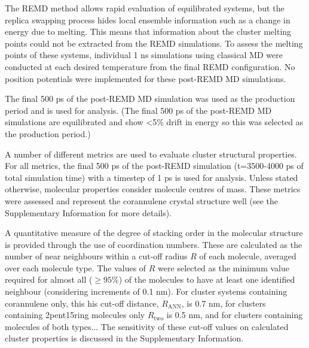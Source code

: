 The REMD method allows rapid evaluation of equilibrated systems, but the replica swapping process hides local ensemble information such as a change in energy due to melting. This means that information about the cluster melting points could not be extracted from the REMD simulations. To assess the melting points of these systems, individual 1 ns simulations using classical MD were conducted at each desired temperature from the final REMD configuration. No position potentials were implemented for these post-REMD MD simulations.

The final 500 ps of the post-REMD MD simulation was used as the production period and is used for analysis.
(The final 500 ps of the post-REMD MD simulations are equilibrated and show <5\% drift in energy so this was selected as the production period.)

A number of different metrics are used to evaluate cluster structural properties. For all metrics, the final 500 ps of the post-REMD simulation (t=3500-4000 ps of total simulation time) with a timestep of 1 ps is used for analysis. Unless stated otherwise, molecular properties consider molecule centres of mass.
These metrics were assessed and represent the corannulene crystal structure well (see the Supplementary Information for more details).


A quantitative measure of the degree of stacking order in the molecular structure is provided through the use of coordination numbers. These are calculated as the number of near neighbours within a cut-off radius $R$ of each molecule, averaged over each molecule type. 
The values of $R$ were selected as the minimum value required for almost all ($\ge 95\%$) of the molecules to have at least one identified neighbour (considering increments of 0.1 nm).  For cluster systems containing corannulene only, this his cut-off distance, $R_{\text{ANN}}$, is 0.7 nm, for clusters containing 2pent15ring molecules only $R_{\text{two}}$ is 0.5 nm, and for clusters containing molecules of both types... %
The sensitivity of these cut-off values on calculated cluster properties is discussed in the Supplementary Information.

